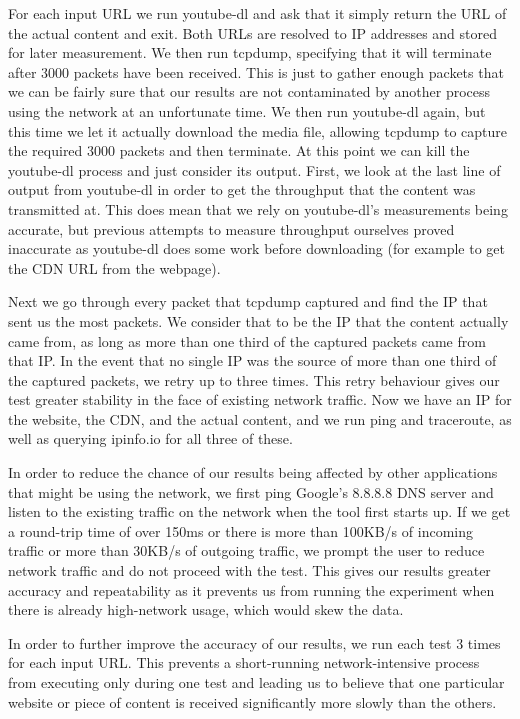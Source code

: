 \documentclass{sig-alternate-05-2015}
\begin{document}
For each input URL we run youtube-dl and ask that it simply return the URL of the actual content and exit. Both URLs are resolved to IP addresses and stored for later measurement. We then run tcpdump, specifying that it will terminate after 3000 packets have been received. This is just to gather enough packets that we can be fairly sure that our results are not contaminated by another process using the network at an unfortunate time. We then run youtube-dl again, but this time we let it actually download the media file, allowing tcpdump to capture the required 3000 packets and then terminate. At this point we can kill the youtube-dl process and just consider its output. First, we look at the last line of output from youtube-dl in order to get the throughput that the content was transmitted at. This does mean that we rely on youtube-dl's measurements being accurate, but previous attempts to measure throughput ourselves proved inaccurate as youtube-dl does some work before downloading (for example to get the CDN URL from the webpage).

Next we go through every packet that tcpdump captured and find the IP that sent us the most packets. We consider that to be the IP that the content actually came from, as long as more than one third of the captured packets came from that IP. In the event that no single IP was the source of more than one third of the captured packets, we retry up to three times. This retry behaviour gives our test greater stability in the face of existing network traffic. Now we have an IP for the website, the CDN, and the actual content, and we run ping and traceroute, as well as querying ipinfo.io for all three of these.

In order to reduce the chance of our results being affected by other applications that might be using the network, we first ping Google's 8.8.8.8 DNS server and listen to the existing traffic on the network when the tool first starts up. If we get a round-trip time of over 150ms or there is more than 100KB/s of incoming traffic or more than 30KB/s of outgoing traffic, we prompt the user to reduce network traffic and do not proceed with the test. This gives our results greater accuracy and repeatability as it prevents us from running the experiment when there is already high-network usage, which would skew the data.

In order to further improve the accuracy of our results, we run each test 3 times for each input URL. This prevents a short-running network-intensive process from executing only during one test and leading us to believe that one particular website or piece of content is received significantly more slowly than the others.
\end{document}
